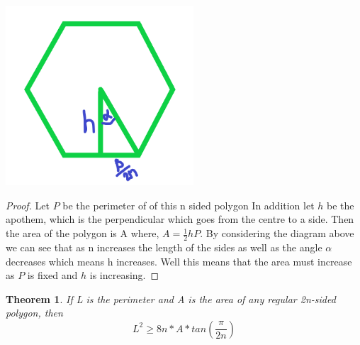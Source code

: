 \documentclass[a4paper]{book}
\newtheorem{theorem}{Theorem}%
\begin{document}
\begin{minipage}{\linewidth}
    \centering
    \includegraphics[width=7cm]{isofig10.png}
\end{minipage}
\begin{proof} 
    Let $P$ be the perimeter of of this n sided polygon In addition let $h$ be the apothem, which is the perpendicular which goes from the centre to a side. Then the area of the polygon is A where,  $A=\frac{1}{2} hP$. By considering the diagram above we can see that as n increases the length of the sides as well as the angle $\alpha$ decreases which means h increases. Well this means that the area must increase as $P$ is fixed and $h$ is increasing.
\end{proof}
\begin{theorem}   If L is the perimeter and A is the area of
any regular 2n-sided polygon, then $$L^{2} \ge 8n*A*tan(\frac{\pi}{2n})$$
\end{theorem}
\end{document}
